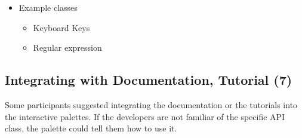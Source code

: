 \documentclass[conference]{IEEEtran}
\begin{document}
\begin{itemize}
	\item Example classes
	
	\begin{itemize}
		\item Keyboard Keys
		\item Regular expression
	\end{itemize}
\end{itemize}

\subsection{Integrating with Documentation, Tutorial (7)}
Some participants suggested integrating the documentation or the tutorials into the interactive palettes. If the developers are not familiar of the specific API class, the palette could tell them how to use it.


%
%
\end{document}
